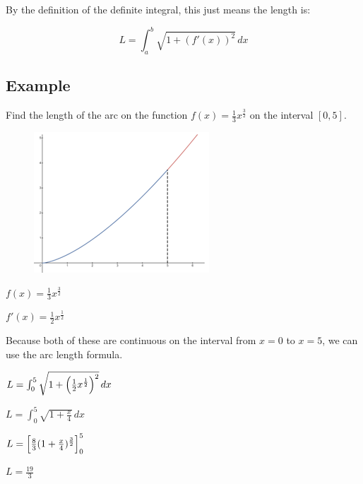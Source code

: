\documentclass[../main.tex]{subfiles}
\begin{document}
By the definition of the definite integral, this just means the length is:

\[L=\int_a^b \sqrt{1+(f'(x))^2}\,dx\]

\pagebreak
\subsection*{Example}
Find the length of the arc on the function $f(x)=\frac{1}{3}x^{\frac{3}{2}}$ on the interval $[0,5]$.

\begin{figure}[h]
    \centering
    \includegraphics[width=0.3\linewidth]{images/arclength4.png}
\end{figure}

$f(x)=\frac{1}{3}x^{\frac{3}{2}}$

$f'(x)=\frac{1}{2}x^{\frac{1}{2}}$

Because both of these are continuous on the interval from $x=0$ to $x=5$, we can use the arc length formula.

$L=\int_0^5 \sqrt{1+\Bigl(\frac{1}{2}x^{\frac{1}{2}}\Bigr)^2}\,dx$

$L=\int_0^5 \sqrt{1+\frac{x}{4}}\,dx$

$L=\Bigl[\frac{8}{3}(1+\frac{x}{4})^{\frac{3}{2}}\Bigr]_0^5$

$L=\frac{19}{3}$

\pagebreak
\end{document}
